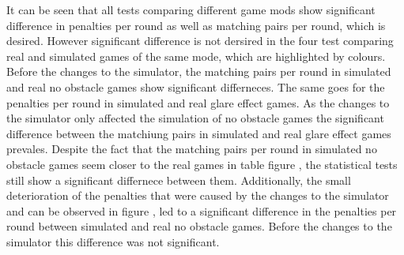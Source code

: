 It can be seen that all tests comparing different game mods show significant difference in penalties per round as well as matching pairs per round, which is desired. However significant difference is not dersired in the four test comparing real and simulated games of the same mode, which are highlighted by colours. Before the changes to the simulator, the matching pairs per round in simulated and real no obstacle games show significant differneces. The same goes for the penalties per round in simulated and real glare effect games. As the changes to the simulator only affected the simulation of no obstacle games the significant difference between the matchiung pairs in simulated and real glare effect games prevales. Despite the fact that the matching pairs per round in simulated no obstacle games seem closer to the real games in table figure , the statistical tests still show a significant differnece between them. Additionally, the small deterioration of the penalties that were caused by the changes to the simulator and can be observed in figure , led to a significant difference in the penalties per round between simulated and real no obstacle games. Before the changes to the simulator this difference was not significant.  

